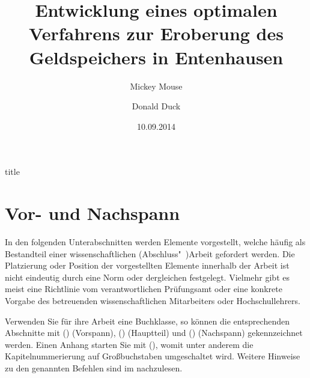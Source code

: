 \documentclass[%
  english,ngerman,%
  cdgeometry=no,DIV=12,%
  cd=false,cdfont=false,cdtitle=true,%
  headings=normal,%
  automark,%
  listof=toc,%
]{tudscrartcl}
\begin{document}
\begin{Trunk!}{title}
\title{%
  Entwicklung eines optimalen Verfahrens zur Eroberung des
  Geldspeichers in Entenhausen
}
\author{%
  Mickey Mouse%
\and%
  Donald Duck%
}
\date{10.09.2014}
\makecover
\maketitle

\end{Trunk!}



\section{Vor- und Nachspann}
In den folgenden Unterabschnitten werden Elemente vorgestellt, welche häufig 
als Bestandteil einer wissenschaftlichen (Abschluss"~)Arbeit gefordert werden. 
Die Platzierung oder Position der vorgestellten Elemente innerhalb der Arbeit 
ist nicht eindeutig durch eine Norm oder dergleichen festgelegt. Vielmehr gibt 
es meist eine Richtlinie vom verantwortlichen Prüfungsamt oder eine konkrete 
Vorgabe des betreuenden wissenschaftlichen Mitarbeiters oder Hochschullehrers.

Verwenden Sie für ihre Arbeit eine Buchklasse, so können die entsprechenden 
Abschnitte mit () (Vorspann), 
() (Hauptteil) und 
() (Nachspann) gekennzeichnet werden. 
Einen Anhang starten Sie mit (), womit 
unter anderem die Kapitelnummerierung auf Großbuchstaben umgeschaltet wird. 
Weitere Hinweise zu den genannten Befehlen sind im \scrguide nachzulesen.
\end{document}
